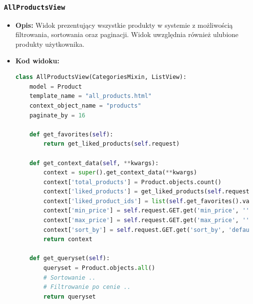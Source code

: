 \documentclass[12pt,a4paper,oneside]{article}
\theoremstyle{definition}
\numberwithin{equation}{section}
\begin{document}
\subsubsection*{\texttt{AllProductsView}}
    \begin{itemize}
        \item \textbf{Opis:} Widok prezentujący wszystkie produkty w systemie z możliwością filtrowania, sortowania oraz paginacji. Widok uwzględnia również ulubione produkty użytkownika.
        \item \textbf{Kod widoku:}
    \begin{lstlisting}[language=Python, caption=\texttt{AllProductsView}]
class AllProductsView(CategoriesMixin, ListView):
    model = Product
    template_name = "all_products.html"
    context_object_name = "products"
    paginate_by = 16

    def get_favorites(self):
        return get_liked_products(self.request)

    def get_context_data(self, **kwargs):
        context = super().get_context_data(**kwargs)
        context['total_products'] = Product.objects.count()
        context['liked_products'] = get_liked_products(self.request)
        context['liked_product_ids'] = list(self.get_favorites().values_list('id', flat=True))
        context['min_price'] = self.request.GET.get('min_price', '')
        context['max_price'] = self.request.GET.get('max_price', '')
        context['sort_by'] = self.request.GET.get('sort_by', 'default')
        return context

    def get_queryset(self):
        queryset = Product.objects.all()
        # Sortowanie ..
        # Filtrowanie po cenie ..
        return queryset
    \end{lstlisting}


\end{itemize}
\end{document}
